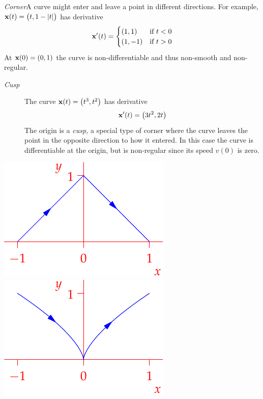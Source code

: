 \begin{examples}[lower separated=false, sidebyside, sidebyside align=top seam, sidebyside gap=0pt, righthand width=0.34\linewidth]{}{}
	\hangindent\leftmargini
	\emph{Corner}\lstsp A curve might enter and leave a point in different directions. For example, ${\mathbf{x}}(t)=\bigl(t,1-\left| t\right|\bigr)$ has derivative
	\[{\mathbf{x}}'(t)=\begin{cases}
	(1,1)&\text{if }t<0\\
	(1,-1)&\text{if }t>0
	\end{cases}\]
	At ${\mathbf{x}}(0)=(0,1)$ the curve is non-differentiable and thus non-smooth and non-regular.
	\begin{description}
		\item[\normalfont\emph{Cusp}] The curve ${\mathbf{x}}(t)=\bigl(t^3,t^2\bigr)$ has derivative 	\[{\mathbf{x}}'(t)= \left(3t^2,2t\right)\]
		The origin is a \emph{cusp,} a special type of corner where the curve leaves the point in the opposite direction to how it entered. In this case the curve is differentiable at the origin, but is non-regular since its speed $v(0)$ is zero.
	\end{description}
	\tcblower
	\flushright\includegraphics{curves-corner}\\
	\includegraphics{curves-cusp}
\end{examples}

\vfil

